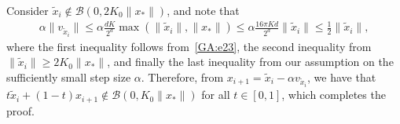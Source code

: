 \documentclass[11pt]{article}
\newcommand{\xo}{x_\ast}
\newcommand{\Tnorm}{}
\newcommand\norm[2][\Tnorm]{\ensuremath{{\left\|#2\right\|}_{#1}}}
\newcommand\stepdir[1]{\tilde v_{#1}}
\newcommand\ball{\mathcal B}
\newcommand{\whcomm}[2]{{\color{black} #1}{\color{black} #2}} %
\begin{document}
\whcomm{}{
Consider $\tilde{x}_i \notin \mathcal{B}(0, 2 K_0 \|x_*\|)$, and note that
\begin{align*}
\alpha \|{v}_{\tilde{x}_i}\| \leq \alpha \frac{d K}{2^d} \max(\|\tilde{x}_i\|, \|x_*\|) \leq \alpha \frac{16 \pi K d}{2^d}\|\tilde{x}_i\| \leq \frac{1}{2}\|\tilde{x}_i\|,
\end{align*}
where the first inequality follows from~\eqref{GA:e23}, the second inequality from $\|\tilde{x}_i\| \geq 2 K_0 \|x_*\|$, and finally the last inequality from our assumption on the sufficiently small step size $\alpha$. Therefore, from $x_{i + 1} = \tilde{x}_i - \alpha {v}_{\tilde{x}_i}$, we have that $t \tilde{x}_i + (1 - t) x_{i+1} \notin \mathcal{B}(0, K_0 \|x_*\|)$ for all $t \in [0, 1]$, which completes the proof.
}

%
%
\end{document}
